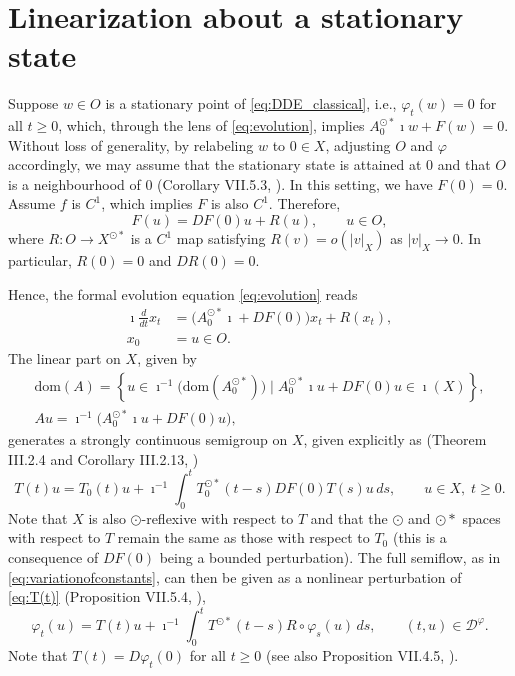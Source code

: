 \documentclass[a4paper, 12pt, oneside, reqno, notitlepage]{amsart}
\theoremstyle{plain}
\theoremstyle{definition}
\theoremstyle{remark}
\newcommand{\dom}{\mathrm{dom}}
\begin{document}
\section{Linearization about a stationary state}
\label{sect:linearization}



Suppose $w \in O$ is a stationary point of \eqref{eq:DDE_classical}, i.e., $\varphi_t(w) =0$ for all $t \geq 0$, which, through the lens of \eqref{eq:evolution}, implies $A_0^{\odot * }\imath w + F(w) = 0$.
Without loss of generality, by relabeling $w$ to $0 \in X$, adjusting $O$ and $\varphi$ accordingly, we may assume that the stationary state is attained at $0$ and that $O$ is a neighbourhood of $0$ (Corollary VII.5.3, \cite{diekmann2012delay}). 
In this setting, we have $F(0) = 0$.
Assume $f$ is $C^1$, which implies $F$ is also $C^1$.
Therefore, 
\begin{equation}
    F(u) =  DF(0) u +R(u), \qquad u \in O,
    \label{eq:Fexpansion}
\end{equation}
where $R:O \to X^{\odot*}$ is a $C^1$ map satisfying $R(v) = o(|v|_X)$ as $|v|_X \to 0$.
In particular, $R(0) = 0$ and $DR(0) =0$.

Hence, the formal evolution equation \eqref{eq:evolution} reads
\begin{align*}
    \imath \frac{d}{dt} x_t &= \big( A_0^{\odot *} \imath + DF(0) \big) x_t + R(x_t),\\
    x_0 &= u \in O.
\end{align*}
The linear part on $X$, given by
\begin{subequations} \label{eq:A}
    \begin{gather}
    \dom(A) = \left\{ u \in \imath^{-1} \big( \dom(A_0^{\odot *}) \big)  \; \big| \;  A_0^{\odot *} \imath u + DF(0) u \in \imath (X) \right\}, \\
    A u= \imath^{-1}\big( A_0^{\odot *} \imath u + DF(0)u \big),
\end{gather}
\end{subequations}
generates a strongly continuous semigroup on $X$, given explicitly as (Theorem III.2.4 and Corollary III.2.13, \cite{diekmann2012delay})
\begin{equation}
    T (t) u= T_0(t)u + \imath^{-1} \int_0^t T^{\odot *}_0 (t-s) DF(0) T(s)u \, ds, \qquad u \in X, \; t \geq 0.
    \label{eq:T(t)}
\end{equation}
Note that $X$ is also $\odot$-reflexive with respect to $T$ and that the $\odot$ and $\odot*$ spaces with respect to $T$ remain the same as those with respect to $T_0$ (this is a consequence of $DF(0)$ being a bounded perturbation).
The full semiflow, as in \eqref{eq:variationofconstants}, can then be given as a nonlinear perturbation of \eqref{eq:T(t)} (Proposition VII.5.4, \cite{diekmann2012delay}),
\begin{equation}
    \varphi_t(u) = T(t) u + \imath^{-1} \int_0^t T^{\odot *} (t-s) R \circ \varphi_s(u) \, ds,  \qquad (t,u) \in \mathcal{D}^\varphi.
    \label{eq:semiflow_pert}
\end{equation}
Note that $T(t) = D\varphi_t(0)$ for all $t \geq 0$ (see also Proposition VII.4.5, \cite{diekmann2012delay}). 
\end{document}
